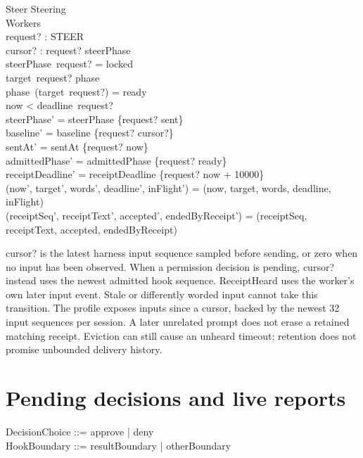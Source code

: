 \documentclass[a4paper,10pt,fleqn]{article}
\begin{document}
\begin{schema}{Steer}
  \Delta Steering \\
  \Xi Workers \\
  request? : STEER \\
  cursor? : \nat
\where
  request? \in \dom steerPhase \\
  steerPhase~request? = locked \\
  target~request? \in \dom phase \\
  phase~(target~request?) = ready \\
  now < deadline~request? \\
  steerPhase' = steerPhase \oplus \{request? \mapsto sent\} \\
  baseline' = baseline \cup \{request? \mapsto cursor?\} \\
  sentAt' = sentAt \cup \{request? \mapsto now\} \\
  admittedPhase' = admittedPhase \cup \{request? \mapsto ready\} \\
  receiptDeadline' = receiptDeadline \cup \{request? \mapsto now + 10000\} \\
  (now', target', words', deadline', inFlight') =
    (now, target, words, deadline, inFlight) \\
  (receiptSeq', receiptText', accepted', endedByReceipt') =
    (receiptSeq, receiptText, accepted, endedByReceipt)
\end{schema}

cursor? is the latest harness input sequence sampled before sending, or zero
when no input has been observed. When a permission decision is pending, cursor? instead
uses the newest admitted hook sequence. ReceiptHeard uses the worker's own later
input event. Stale or differently worded input cannot take this transition.
The profile exposes inputs since a cursor, backed by the newest 32 input
sequences per session. A later unrelated prompt does not erase a retained
matching receipt. Eviction can still cause an unheard timeout; retention
does not promise unbounded delivery history.

\section{Pending decisions and live reports}

\begin{zed}
  DecisionChoice ::= approve | deny
  \\
  HookBoundary ::= resultBoundary | otherBoundary
\end{zed}
\end{document}
